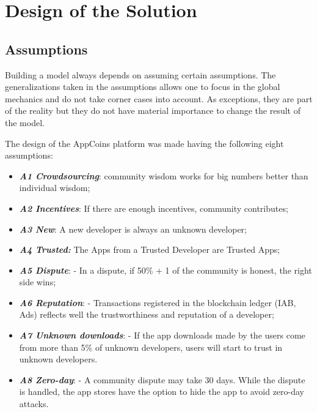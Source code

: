\section{Design of the Solution}

\label{sec:design}

\subsection{Assumptions}


Building a model always depends on assuming certain assumptions. The generalizations taken in the assumptions allows one to focus in the global mechanics and do not take corner cases into account. As exceptions, they are part of the reality but they do not have material importance to change the result of the model.

The design of the AppCoins platform was made having the following eight assumptions:

\begin{itemize}
\item {\bf\em A1 Crowdsourcing}: community wisdom works for big numbers better than individual wisdom\cite{Surowiecki:2005:WC:1095645};
\item {\bf\em A2 Incentives}: If there are enough incentives, community contributes;
\item {\bf\em A3 New}: A new developer is always an unknown developer;
\item {\bf\em A4 Trusted:} The Apps from a Trusted Developer are Trusted Apps;
\item {\bf\em A5 Dispute}: - In a dispute, if 50\% + 1 of the community is honest, the right side wins;
\item {\bf\em A6 Reputation}: - Transactions registered in the blockchain ledger (IAB, Ads) reflects well the trustworthiness and reputation of a developer;
\item {\bf\em A7 Unknown downloads}: - If the app downloads made by the users come from more than 5\% of unknown developers, users will start to trust in unknown developers. %
\item {\bf\em A8 Zero-day}: - A community dispute may take 30 days. While the dispute is handled, the app stores have the option to hide the app to avoid zero-day attacks.
\end{itemize}



